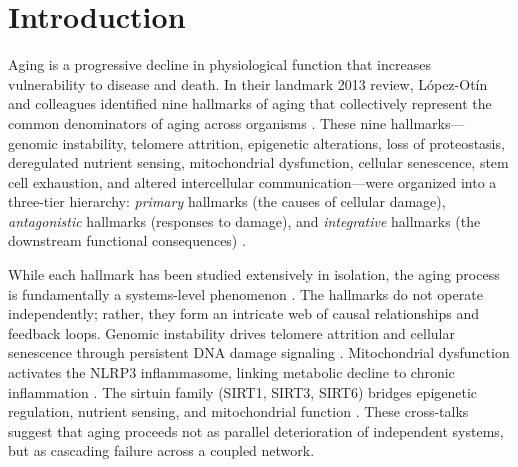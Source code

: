 \documentclass[11pt,a4paper]{article}
\begin{document}
\begin{abstract}
\noindent
\textbf{Conclusions:} We provide an open-source computational framework for dissecting hallmark-level aging interactions, with transparent benchmarking revealing both strengths (best-threshold edge F1, age-effect recovery, cross-hallmark predictability) and limitations (edge-ranking AUROC, module recovery, edge stability). The honest characterization of recovery performance under idealized simulation conditions establishes baseline expectations for future application to real transcriptomic cohorts.

\vspace{0.5em}
\noindent\textbf{Keywords:} hallmarks of aging, network biology, gene set enrichment, machine learning, biological age, simulation benchmark, systems biology
\end{abstract}

\newpage

\section{Introduction}

Aging is a progressive decline in physiological function that increases vulnerability to disease and death. In their landmark 2013 review, L\'{o}pez-Ot\'{i}n and colleagues identified nine hallmarks of aging that collectively represent the common denominators of aging across organisms \citep{lopez2013hallmarks}. These nine hallmarks---genomic instability, telomere attrition, epigenetic alterations, loss of proteostasis, deregulated nutrient sensing, mitochondrial dysfunction, cellular senescence, stem cell exhaustion, and altered intercellular communication---were organized into a three-tier hierarchy: \textit{primary} hallmarks (the causes of cellular damage), \textit{antagonistic} hallmarks (responses to damage), and \textit{integrative} hallmarks (the downstream functional consequences) \citep{lopez2013hallmarks}.

While each hallmark has been studied extensively in isolation, the aging process is fundamentally a systems-level phenomenon \citep{kennedy2014geroscience}. The hallmarks do not operate independently; rather, they form an intricate web of causal relationships and feedback loops. Genomic instability drives telomere attrition and cellular senescence through persistent DNA damage signaling \citep{fagagna2003dna}. Mitochondrial dysfunction activates the NLRP3 inflammasome, linking metabolic decline to chronic inflammation \citep{green2011mitochondria}. The sirtuin family (SIRT1, SIRT3, SIRT6) bridges epigenetic regulation, nutrient sensing, and mitochondrial function \citep{guarente2011sirtuins}. These cross-talks suggest that aging proceeds not as parallel deterioration of independent systems, but as cascading failure across a coupled network.
\end{document}
